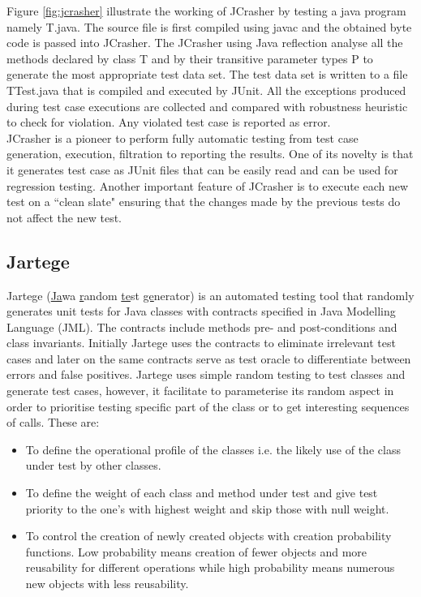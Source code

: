 Figure \ref{fig:jcrasher} illustrate the working of JCrasher by testing a java program namely T.java. The source file is first compiled using javac and the obtained byte code is passed into JCrasher. The JCrasher using Java reflection \cite{chan1999java}  analyse all the methods declared by class T and by their transitive parameter types P to generate the most appropriate test data set. The test data set is written to a file TTest.java that is compiled and executed by JUnit. All the exceptions produced during test case executions are collected and compared with robustness heuristic to check for violation. Any violated test case is reported as error.\\

JCrasher is a pioneer to perform fully automatic testing from test case generation, execution, filtration to reporting the results. One of its novelty  is that it generates test case as JUnit files that can be easily read and can be used for regression testing. Another important feature of JCrasher is to execute each new test on a ``clean slate" ensuring that the changes made by the previous tests do not affect the new test.  



\subsection{Jartege}
Jartege (\uline{Ja}wa \uline{r}andom \uline{te}st \uline{ge}nerator) \cite{Oriat2004} is an automated testing tool that randomly generates unit tests for Java classes with contracts specified in Java Modelling Language (JML). The contracts include methods pre- and post-conditions and class invariants. Initially Jartege uses the contracts to eliminate irrelevant test cases and later on the same contracts serve as test oracle to differentiate between errors and false positives. Jartege uses simple random testing to test classes and generate test cases, however, it facilitate to parameterise its random aspect in order to prioritise testing specific part of the class or to get interesting sequences of calls. These are: 
\begin{itemize}
\item To define the operational profile of the classes i.e. the likely use of the class under test by other classes.  
\item To define the weight of each class and method under test and give test priority to the one's with highest weight and skip those with null weight.
\item To control the creation of newly created objects with creation probability functions. Low probability means creation of fewer objects and more reusability for different operations while high probability means numerous new objects with less reusability.
\end{itemize}

